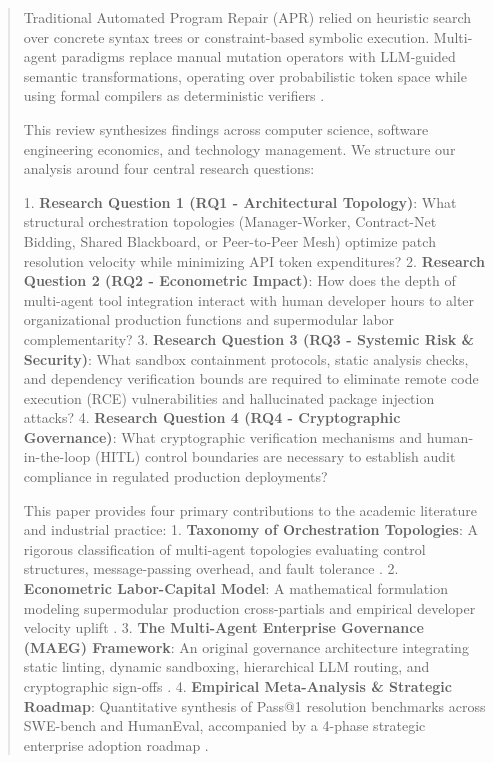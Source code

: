 \documentclass[10pt,journal,compsoc,twocolumn]{IEEEtran}
\begin{document}
\begin{abstract}
Traditional Automated Program Repair (APR) relied on heuristic search over concrete syntax trees or constraint-based symbolic execution. Multi-agent paradigms replace manual mutation operators with LLM-guided semantic transformations, operating over probabilistic token space while using formal compilers as deterministic verifiers \cite{arxiv_2302_10809}.


This review synthesizes findings across computer science, software engineering economics, and technology management. We structure our analysis around four central research questions:

1. \textbf{Research Question 1 (RQ1 - Architectural Topology)}: What structural orchestration topologies (Manager-Worker, Contract-Net Bidding, Shared Blackboard, or Peer-to-Peer Mesh) optimize patch resolution velocity while minimizing API token expenditures?
2. \textbf{Research Question 2 (RQ2 - Econometric Impact)}: How does the depth of multi-agent tool integration interact with human developer hours to alter organizational production functions and supermodular labor complementarity?
3. \textbf{Research Question 3 (RQ3 - Systemic Risk \& Security)}: What sandbox containment protocols, static analysis checks, and dependency verification bounds are required to eliminate remote code execution (RCE) vulnerabilities and hallucinated package injection attacks?
4. \textbf{Research Question 4 (RQ4 - Cryptographic Governance)}: What cryptographic verification mechanisms and human-in-the-loop (HITL) control boundaries are necessary to establish audit compliance in regulated production deployments?


This paper provides four primary contributions to the academic literature and industrial practice:
1. \textbf{Taxonomy of Orchestration Topologies}: A rigorous classification of multi-agent topologies evaluating control structures, message-passing overhead, and fault tolerance \cite{wooldridge2009}.
2. \textbf{Econometric Labor-Capital Model}: A mathematical formulation modeling supermodular production cross-partials and empirical developer velocity uplift \cite{joshua2026adoptiondepth}.
3. \textbf{The Multi-Agent Enterprise Governance (MAEG) Framework}: An original governance architecture integrating static linting, dynamic sandboxing, hierarchical LLM routing, and cryptographic sign-offs \cite{feuerriegel2023generativeai}.
4. \textbf{Empirical Meta-Analysis \& Strategic Roadmap}: Quantitative synthesis of Pass@1 resolution benchmarks across SWE-bench and HumanEval, accompanied by a 4-phase strategic enterprise adoption roadmap \cite{rogers2003}.
\end{abstract}
\end{document}
